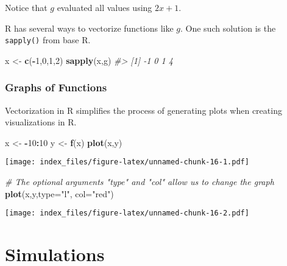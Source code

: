 \documentclass[
]{book}
\newenvironment{Shaded}{\begin{snugshade}}{\end{snugshade}}
\newcommand{\AttributeTok}[1]{\textcolor[rgb]{0.13,0.29,0.53}{#1}}
\newcommand{\CommentTok}[1]{\textcolor[rgb]{0.56,0.35,0.01}{\textit{#1}}}
\newcommand{\DecValTok}[1]{\textcolor[rgb]{0.00,0.00,0.81}{#1}}
\newcommand{\FunctionTok}[1]{\textcolor[rgb]{0.13,0.29,0.53}{\textbf{#1}}}
\newcommand{\NormalTok}[1]{#1}
\newcommand{\OtherTok}[1]{\textcolor[rgb]{0.56,0.35,0.01}{#1}}
\newcommand{\SpecialCharTok}[1]{\textcolor[rgb]{0.81,0.36,0.00}{\textbf{#1}}}
\newcommand{\StringTok}[1]{\textcolor[rgb]{0.31,0.60,0.02}{#1}}
\theoremstyle{definition}
\theoremstyle{definition}
\theoremstyle{definition}
\theoremstyle{definition}
\theoremstyle{remark}
\begin{document}
Notice that \(g\) evaluated all values using \(2x+1\).

R has several ways to vectorize functions like \(g\). One such solution is the \texttt{sapply()} from base R.

\begin{Shaded}
\begin{Highlighting}[]
\NormalTok{x }\OtherTok{\textless{}{-}} \FunctionTok{c}\NormalTok{(}\SpecialCharTok{{-}}\DecValTok{1}\NormalTok{,}\DecValTok{0}\NormalTok{,}\DecValTok{1}\NormalTok{,}\DecValTok{2}\NormalTok{)}
\FunctionTok{sapply}\NormalTok{(x,g)}
\CommentTok{\#\textgreater{} [1] {-}1  0  1  4}
\end{Highlighting}
\end{Shaded}

\hypertarget{graphs-of-functions}{%
\subsection{Graphs of Functions}\label{graphs-of-functions}}

Vectorization in R simplifies the process of generating plots when creating visualizations in R.

\begin{Shaded}
\begin{Highlighting}[]
\NormalTok{x }\OtherTok{\textless{}{-}} \SpecialCharTok{{-}}\DecValTok{10}\SpecialCharTok{:}\DecValTok{10}
\NormalTok{y }\OtherTok{\textless{}{-}} \FunctionTok{f}\NormalTok{(x)}
\FunctionTok{plot}\NormalTok{(x,y)}
\end{Highlighting}
\end{Shaded}

\texttt{[image: index\_files/figure-latex/unnamed-chunk-16-1.pdf]}

\begin{Shaded}
\begin{Highlighting}[]
\CommentTok{\# The optional arguments "type" and "col" allow us to change the graph}
\FunctionTok{plot}\NormalTok{(x,y,}\AttributeTok{type=}\StringTok{"l"}\NormalTok{, }\AttributeTok{col=}\StringTok{"red"}\NormalTok{)}
\end{Highlighting}
\end{Shaded}

\texttt{[image: index\_files/figure-latex/unnamed-chunk-16-2.pdf]}

\hypertarget{simulations}{%
\chapter{Simulations}\label{simulations}}
\end{document}

